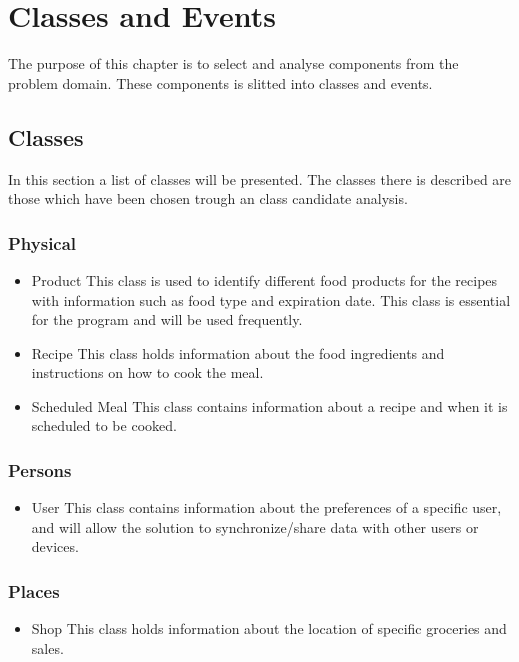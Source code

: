 \chapter{Classes and Events}
The purpose of this chapter is to select and analyse components from the problem domain. These components is slitted into classes and events.

\section{Classes}
In this section a list of classes will be presented. The classes there is described are those which have been chosen trough an class candidate analysis.

\subsection{Physical}
\begin{itemize}
\item Product
	\subitem This class is used to identify different food products for the recipes with information such as food type and expiration date. This class is essential for the program and will be used frequently.
\item Recipe
	\subitem This class holds information about the food ingredients and instructions on how to cook the meal.
\item Scheduled Meal
	\subitem This class contains information about a recipe and when it is scheduled to be cooked.
\end{itemize}

\subsection{Persons}
\begin{itemize}
\item User
	\subitem This class contains information about the preferences of a specific user, and will allow the solution to synchronize/share data with other users or devices.
\end{itemize}

\subsection{Places}
\begin{itemize}
\item Shop
	\subitem This class holds information about the location of specific groceries and sales.
\end{itemize}

